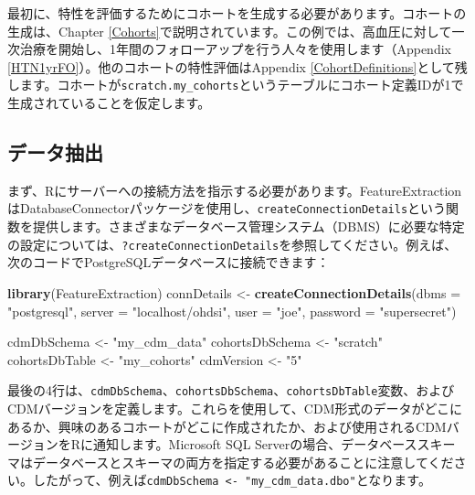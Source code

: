 \documentclass[
  11pt]{book}
\newenvironment{Shaded}{\begin{snugshade}}{\end{snugshade}}
\newcommand{\AttributeTok}[1]{\textcolor[rgb]{0.13,0.29,0.53}{#1}}
\newcommand{\FunctionTok}[1]{\textcolor[rgb]{0.13,0.29,0.53}{\textbf{#1}}}
\newcommand{\NormalTok}[1]{#1}
\newcommand{\OtherTok}[1]{\textcolor[rgb]{0.56,0.35,0.01}{#1}}
\newcommand{\StringTok}[1]{\textcolor[rgb]{0.31,0.60,0.02}{#1}}
\theoremstyle{definition}
\theoremstyle{definition}
\theoremstyle{definition}
\theoremstyle{definition}
\theoremstyle{remark}
\begin{document}
最初に、特性を評価するためにコホートを生成する必要があります。コホートの生成は、Chapter \ref{Cohorts}で説明されています。この例では、高血圧に対して一次治療を開始し、1年間のフォローアップを行う人々を使用します（Appendix \ref{HTN1yrFO}）。他のコホートの特性評価はAppendix \ref{CohortDefinitions}として残します。コホートが\texttt{scratch.my\_cohorts}というテーブルにコホート定義IDが1で生成されていることを仮定します。

\subsection{データ抽出}\label{ux30c7ux30fcux30bfux62bdux51fa}

まず、Rにサーバーへの接続方法を指示する必要があります。FeatureExtractionはDatabaseConnectorパッケージを使用し、\texttt{createConnectionDetails}という関数を提供します。さまざまなデータベース管理システム（DBMS）に必要な特定の設定については、\texttt{?createConnectionDetails}を参照してください。例えば、次のコードでPostgreSQLデータベースに接続できます：

\begin{Shaded}
\begin{Highlighting}[]
\FunctionTok{library}\NormalTok{(FeatureExtraction)}
\NormalTok{connDetails }\OtherTok{\textless{}{-}} \FunctionTok{createConnectionDetails}\NormalTok{(}\AttributeTok{dbms =} \StringTok{"postgresql"}\NormalTok{,}
                                       \AttributeTok{server =} \StringTok{"localhost/ohdsi"}\NormalTok{,}
                                       \AttributeTok{user =} \StringTok{"joe"}\NormalTok{,}
                                       \AttributeTok{password =} \StringTok{"supersecret"}\NormalTok{)}

\NormalTok{cdmDbSchema }\OtherTok{\textless{}{-}} \StringTok{"my\_cdm\_data"}
\NormalTok{cohortsDbSchema }\OtherTok{\textless{}{-}} \StringTok{"scratch"}
\NormalTok{cohortsDbTable }\OtherTok{\textless{}{-}} \StringTok{"my\_cohorts"}
\NormalTok{cdmVersion }\OtherTok{\textless{}{-}} \StringTok{"5"}
\end{Highlighting}
\end{Shaded}

最後の4行は、\texttt{cdmDbSchema}、\texttt{cohortsDbSchema}、\texttt{cohortsDbTable}変数、およびCDMバージョンを定義します。これらを使用して、CDM形式のデータがどこにあるか、興味のあるコホートがどこに作成されたか、および使用されるCDMバージョンをRに通知します。Microsoft SQL Serverの場合、データベーススキーマはデータベースとスキーマの両方を指定する必要があることに注意してください。したがって、例えば\texttt{cdmDbSchema\ \textless{}-\ "my\_cdm\_data.dbo"}となります。
\end{document}
